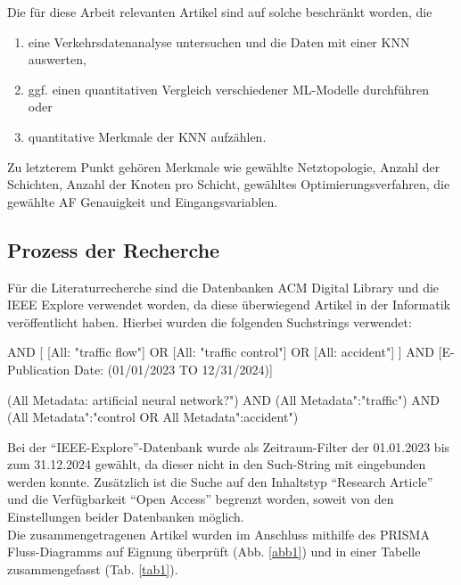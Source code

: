 \documentclass{scrartcl}
\begin{document}
Die für diese Arbeit relevanten Artikel sind auf solche beschränkt worden, die
\begin{enumerate}
   \item{eine Verkehrsdatenanalyse untersuchen und die Daten mit einer KNN auswerten,}
   \item{ggf. einen quantitativen Vergleich verschiedener ML-Modelle durchführen oder}
   \item{quantitative Merkmale der KNN aufzählen.}
\end{enumerate}
Zu letzterem Punkt gehören Merkmale wie gewählte Netztopologie, Anzahl der Schichten,
Anzahl der Knoten pro Schicht, gewähltes Optimierungsverfahren, die gewählte
AF Genauigkeit und Eingangsvariablen.

\subsection{Prozess der Recherche}

Für die Literaturrecherche sind die Datenbanken ACM Digital Library und die
IEEE Explore verwendet worden, da diese überwiegend Artikel in der Informatik
veröffentlicht haben.
Hierbei wurden die folgenden Suchstrings verwendet:

\begin{tcolorbox}
   AND [
         [All: "traffic flow"]
         OR [All: "traffic control"]
         OR [All: \dq accident"]
      ]
   AND [E-Publication Date: (01/01/2023 TO 12/31/2024)]
\end{tcolorbox}

\begin{tcolorbox}[
      enhanced,
      attach boxed title to top left,
      colback=gray!20,
      colframe=gray,
      colbacktitle=gray,
      title=IEEE Explore,
      fonttitle=\bfseries\color{black},
      boxed title style={size=small, colframe=gray, sharp corners},
      sharp corners
   ]
   (\dq All Metadata\dq: \dq artificial neural network?")
   AND (\dq All Metadata":"traffic")
   AND (\dq All Metadata":"control\dq\space
   OR \dq All Metadata":\dq accident")
\end{tcolorbox}

Bei der \enquote{IEEE-Explore}-Datenbank wurde als Zeitraum-Filter der 01.01.2023
bis zum 31.12.2024 gewählt, da dieser nicht in den Such-String mit eingebunden
werden konnte.  Zusätzlich ist die Suche auf den Inhaltstyp
\enquote{Research Article} und die Verfügbarkeit \enquote{Open Access}
begrenzt worden, soweit von den Einstellungen beider Datenbanken möglich.
\medskip \\
Die zusammengetragenen Artikel wurden im Anschluss mithilfe des PRISMA
Fluss-Diagramms \cite{prisma} auf Eignung überprüft (Abb. \ref{abb1}) und in einer Tabelle
zusammengefasst (Tab. \ref{tab1}).
\end{document}
